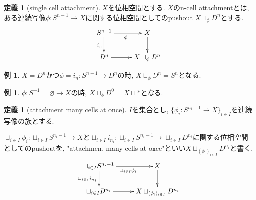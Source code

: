 \documentclass[dvipdfmx,a4paper,11pt]{article}
\theoremstyle{definition}
\newtheorem{dfn}[thm]{定義}
\newtheorem{exa}[thm]{例}
\begin{document}
 \begin{tcolorbox}
 [colback = white, colframe = green!35!black, fonttitle = \bfseries,breakable = true]
\begin{dfn}[single cell attachment]
$X$を位相空間とする. 
$X$のn-cell attachmentとは, ある連続写像$\phi : S^{n-1} \to X$に関する位相空間としてのpushout $X \sqcup_{\phi}D^{n}$とする. 
\begin{equation*}
\xymatrix@C=25pt@R=20pt{
S^{n-1} \ar@{->}[r]_{\phi} \ar@{->}[d]_{i_n}&X \ar@{->}[d]\\
D^{n} \ar@{->}[r] &X \sqcup_{\phi}D^{n} \\   
}
\end{equation*}

\end{dfn}
\end{tcolorbox}

\begin{exa}
$X=D^n$かつ$\phi = i_n : S^{n-1} \to D^n$の時, 
$X \sqcup_{\phi}D^{n} = S^{n}$となる. 
\end{exa}

\begin{exa}
$\phi  : S^{-1} = \varnothing \to X$の時, 
$X \sqcup_{\phi}D^{0} = X \sqcup \ast$となる. 
\end{exa}


 \begin{tcolorbox}
 [colback = white, colframe = green!35!black, fonttitle = \bfseries,breakable = true]
\begin{dfn}[attachment many cells at once]
\label{dfn-attach-many}
$I$を集合とし, $\{ \phi_{i} : S^{n_{i}-1} \to X \}_{i \in I}$を連続写像の族とする.
 
 $\sqcup_{i \in I} \phi_i : \sqcup_{i \in I} S^{n_{i}-1} \to X$と$\sqcup_{i \in I}i_{n_i} : \sqcup_{i \in I} S^{n_{i}-1} \to \sqcup_{i \in I} D^{n_{i}} $に関する位相空間としてのpushoutを, "attachment many cells at once"といい$X \sqcup_{(\phi_i)_{i \in I}} D^{n_{i}} $と書く.  
\begin{equation*}
\xymatrix@C=25pt@R=20pt{
\sqcup_{i \in I} S^{n_{i}-1}  \ar@{->}[r]_{\sqcup_{i \in I} \phi_i } \ar@{->}[d]_{\sqcup_{i \in I}i_{n_i}}&X \ar@{->}[d]\\
 \sqcup_{i \in I} D^{n_{i}}  \ar@{->}[r] &X \sqcup_{(\phi_i)_{i \in I}}D^{n_{i}} \\   
}
\end{equation*}
\end{dfn}
\end{tcolorbox}
\end{document}
